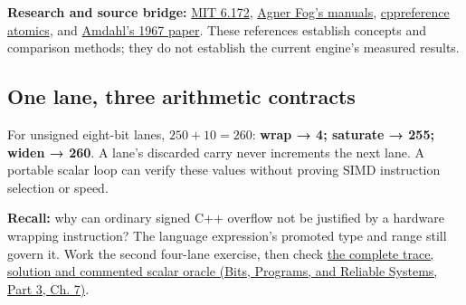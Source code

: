 \textbf{Research and source bridge:} \href{https://ocw.mit.edu/courses/6-172-performance-engineering-of-software-systems-fall-2018/video_galleries/lecture-videos/}{MIT 6.172}, \href{https://www.agner.org/optimize/}{Agner Fog's manuals}, \href{https://en.cppreference.com/w/cpp/atomic/memory_order}{cppreference atomics}, and \href{https://doi.org/10.1145/1465482.1465560}{Amdahl's 1967 paper}. These references establish concepts and comparison methods; they do not establish the current engine's measured results.

\subsection{One lane, three arithmetic contracts}\label{appendix-2587680a4fe3-one-lane-three-arithmetic-contracts}

\hypertarget{appendix-2587680a4fe3-one-lane-three-arithmetic-contracts}{}

For unsigned eight-bit lanes, \(250+10=260\): \textbf{wrap → 4; saturate → 255; widen → 260}. A lane's discarded carry never increments the next lane. A portable scalar loop can verify these values without proving SIMD instruction selection or speed.

\textbf{Recall:} why can ordinary signed C++ overflow not be justified by a hardware wrapping instruction? The language expression's promoted type and range still govern it. Work the second four-lane exercise, then check \href{../01-Bits-Programs-and-Reliable-Systems-P03/main.pdf\#nameddest=01-foundations-i-ch007-three-lane-arithmetic-contracts-wrap-saturate-and-widen}{the complete trace, solution and commented scalar oracle (Bits, Programs, and Reliable Systems, Part 3, Ch. 7)}.
